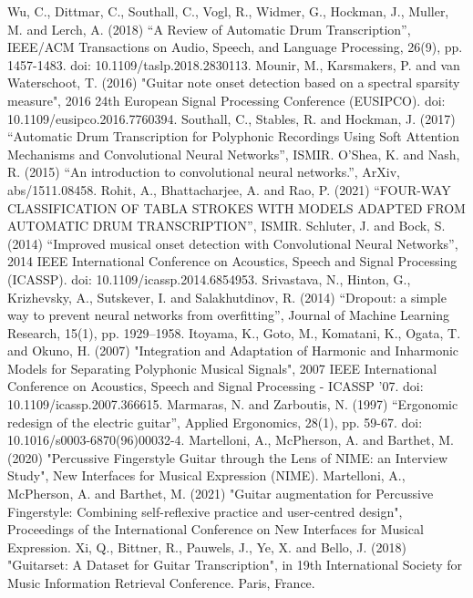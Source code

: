 \documentclass[conference]{IEEEtran}
\begin{document}
\begin{thebibliography}{00}

\bibitem{} Wu, C., Dittmar, C., Southall, C., Vogl, R., Widmer, G., Hockman, J., Muller, M. and Lerch, A. (2018) ``A Review of Automatic Drum Transcription'', IEEE/ACM Transactions on Audio, Speech, and Language Processing, 26(9), pp. 1457-1483. doi: 10.1109/taslp.2018.2830113.    
\bibitem{} Mounir, M., Karsmakers, P. and van Waterschoot, T. (2016) "Guitar note onset detection based on a spectral sparsity measure", 2016 24th European Signal Processing Conference (EUSIPCO). doi: 10.1109/eusipco.2016.7760394.
\bibitem{} Southall, C., Stables, R. and Hockman, J. (2017) ``Automatic Drum Transcription for Polyphonic Recordings Using Soft Attention Mechanisms and Convolutional Neural Networks'', ISMIR.
\bibitem{} O'Shea, K. and Nash, R. (2015) ``An introduction to convolutional neural networks.'', ArXiv, abs/1511.08458.
\bibitem{} Rohit, A., Bhattacharjee, A. and Rao, P. (2021) ``FOUR-WAY CLASSIFICATION OF TABLA STROKES WITH MODELS ADAPTED FROM AUTOMATIC DRUM TRANSCRIPTION'', ISMIR.
\bibitem{} Schluter, J. and Bock, S. (2014) ``Improved musical onset detection with Convolutional Neural Networks'', 2014 IEEE International Conference on Acoustics, Speech and Signal Processing (ICASSP). doi: 10.1109/icassp.2014.6854953.
\bibitem{} Srivastava, N., Hinton, G., Krizhevsky, A., Sutskever, I. and Salakhutdinov, R. (2014) ``Dropout: a simple way to prevent neural networks from overfitting'', Journal of Machine Learning Research, 15(1), pp. 1929–1958.
\bibitem{} Itoyama, K., Goto, M., Komatani, K., Ogata, T. and Okuno, H. (2007) "Integration and Adaptation of Harmonic and Inharmonic Models for Separating Polyphonic Musical Signals", 2007 IEEE International Conference on Acoustics, Speech and Signal Processing - ICASSP '07. doi: 10.1109/icassp.2007.366615.
\bibitem{} Marmaras, N. and Zarboutis, N. (1997) ``Ergonomic redesign of the electric guitar'', Applied Ergonomics, 28(1), pp. 59-67. doi: 10.1016/s0003-6870(96)00032-4.
\bibitem{} Martelloni, A., McPherson, A. and Barthet, M. (2020) "Percussive Fingerstyle Guitar through the Lens of NIME: an Interview Study", New Interfaces for Musical Expression (NIME).
\bibitem{} Martelloni, A., McPherson, A. and Barthet, M. (2021) "Guitar augmentation for Percussive Fingerstyle: Combining self-reflexive practice and user-centred design", Proceedings of the International Conference on New Interfaces for Musical Expression.
\bibitem{} Xi, Q., Bittner, R., Pauwels, J., Ye, X. and Bello, J. (2018) "Guitarset: A Dataset for Guitar Transcription", in 19th International Society for Music Information Retrieval Conference. Paris, France.

\end{thebibliography}
\end{document}
